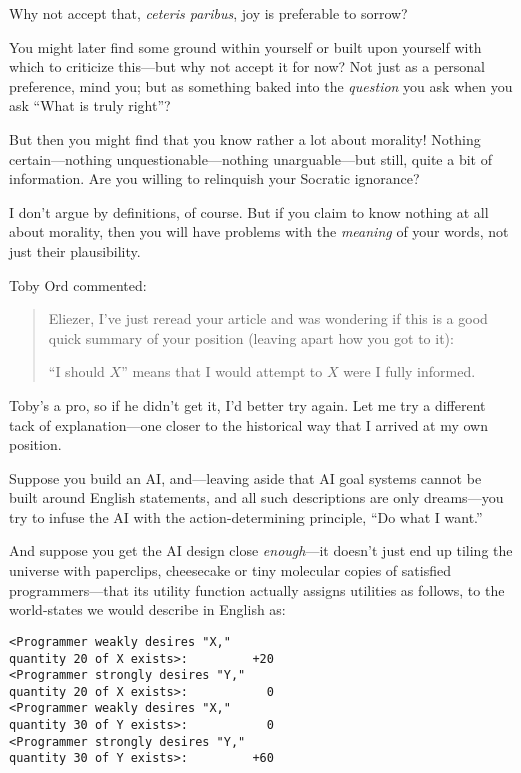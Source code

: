 {
 Why not accept that, \textit{ceteris paribus}, joy is preferable
to sorrow?}

{
 You might later find some ground within yourself or built upon
yourself with which to criticize this---but why not accept it for now?
Not just as a personal preference, mind you; but as something baked
into the \textit{question} you ask when you ask ``What
is truly right''?}

{
 But then you might find that you know rather a lot about morality!
Nothing certain---nothing unquestionable---nothing unarguable---but
still, quite a bit of information. Are you willing to relinquish your
Socratic ignorance?}

{
 I don't argue by definitions, of course. But if
you claim to know nothing at all about morality, then you will have
problems with the \textit{meaning} of your words, not just their
plausibility.}

\myendsectiontext


\bigskip


{
 Toby Ord commented:}

\begin{quotation}
{
 Eliezer, I've just reread your article and was
wondering if this is a good quick summary of your position (leaving
apart how you got to it):}

{
 ``I should $X$'' means that I
  would attempt to $X$ were I fully informed.}
\end{quotation}

{
 Toby's a pro, so if he didn't get
it, I'd better try again. Let me try a different tack
of explanation---one closer to the historical way that I arrived at my
own position.}

{
 Suppose you build an AI, and---leaving aside that AI goal systems
cannot be built around English statements, and all such descriptions
are only dreams---you try to infuse the AI with the action-determining
principle, ``Do what I want.''}

{
 And suppose you get the AI design close \textit{enough}{}---it
doesn't just end up tiling the universe with
paperclips, cheesecake or tiny molecular copies of satisfied
programmers---that its utility function actually assigns utilities as
follows, to the world-states we would describe in English as:}

\begin{verbatim}
<Programmer weakly desires "X,"
quantity 20 of X exists>:         +20
<Programmer strongly desires "Y,"
quantity 20 of X exists>:           0
<Programmer weakly desires "X,"
quantity 30 of Y exists>:           0
<Programmer strongly desires "Y,"
quantity 30 of Y exists>:         +60
\end{verbatim}


